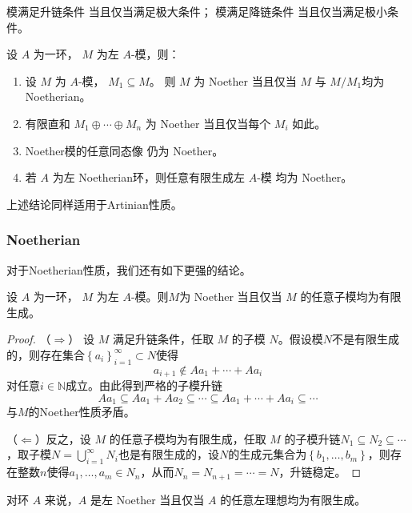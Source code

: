\begin{theorem}\label{thm:chain-max}
    模满足升链条件
    当且仅当满足极大条件；
    模满足降链条件
    当且仅当满足极小条件。
\end{theorem}

\begin{corollary}[链条件的稳定性]\label{cor:chain-stability}
    设 $A$ 为一环， $M$ 为左 $A$-模，则：
    \begin{enumerate}
        \item
              设 $M$ 为 $A$-模，
              $M_1\subseteq M$。
              则
              $M$ 为 Noether
              当且仅当
              $M$  与  $M/M_1 $均为 Noetherian。


        \item
              有限直和  $M_1\oplus\cdots\oplus M_n$
              为 Noether   当且仅当每个 $M_i$ 如此。

        \item
              Noether模的任意同态像
              仍为 Noether。

        \item
              若 $A$ 为左 Noetherian环，则任意有限生成左 $A$-模
              均为 Noether。
    \end{enumerate}
\end{corollary}
\begin{remark}
    上述结论同样适用于Artinian性质。
\end{remark}
\subsubsection{Noetherian}
对于Noetherian性质，我们还有如下更强的结论。
\begin{theorem}
    \label{thm:Noetherian}
    设 $A$ 为一环， $M$ 为左 $A$-模。则$M$为 Noether 当且仅当 $M$ 的任意子模均为有限生成。
    \begin{proof}
        （$\Rightarrow$）
        设 $M$ 满足升链条件，任取 $M$ 的子模 $N$。假设模$N$不是有限生成的，则存在集合$\left\{a_i\right\}_{i=1}^\infty\subset N$使得 $$a_{i+1}\notin Aa_1+\cdots+Aa_i$$对任意$i\in \mathbb{N}$成立。由此得到严格的子模升链
        \begin{equation*}
            Aa_1\subseteq Aa_1+Aa_2\subseteq \cdots \subseteq Aa_1+\cdots+Aa_i\subseteq \cdots
        \end{equation*}
        与$M$的Noether性质矛盾。

        （$\Leftarrow$）反之，设 $M$ 的任意子模均为有限生成，任取 $M$ 的子模升链$N_1\subseteq N_2\subseteq \cdots$，取子模$N = \bigcup_{i=1}^\infty N_i$也是有限生成的，设$N$的生成元集合为$\left\{b_1,\ldots,b_m\right\}$，则存在整数$n$使得$a_1,\ldots,a_m\in N_n$，从而$N_n=N_{n+1}=\cdots=N$，升链稳定。
    \end{proof}
\end{theorem}
\begin{remark}
    对环 $A$ 来说，$A$ 是左 Noether 当且仅当 $A$ 的任意左理想均为有限生成。
\end{remark}

